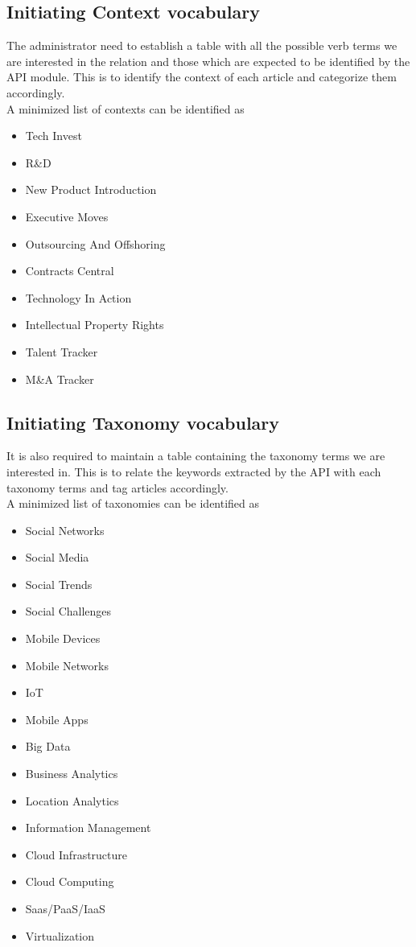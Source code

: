 \subsection{Initiating Context vocabulary}
\par The administrator need to establish a table with all the possible verb terms we are interested in the relation and those which are expected to be identified by the API module. This is to identify the context of each article and categorize them accordingly.
\\ A minimized list of contexts can be identified as 
\begin{itemize}
\item Tech Invest	
\item R\&D	
\item New Product Introduction	
\item Executive Moves	
\item Outsourcing And Offshoring	
\item Contracts Central	
\item Technology In Action	
\item Intellectual Property Rights	
\item Talent Tracker
\item M\&A Tracker
\end{itemize}

\subsection{Initiating Taxonomy vocabulary}
\par It is also required to maintain a table containing the taxonomy terms we are interested in. This is to relate the keywords extracted by the API with each taxonomy terms and tag articles accordingly.
\\
A minimized list of taxonomies can be identified as
\begin{itemize}
\item Social Networks
\item Social Media
\item Social Trends	
\item Social Challenges	
\item Mobile Devices	
\item Mobile Networks	
\item IoT	
\item Mobile Apps
\item Big Data	
\item Business Analytics	
\item Location Analytics	
\item Information Management	
\item Cloud Infrastructure	
\item Cloud Computing	
\item Saas/PaaS/IaaS	
\item Virtualization
\end{itemize}

